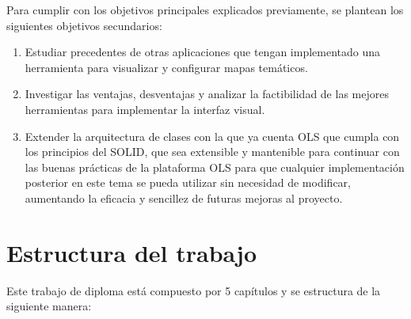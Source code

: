 Para cumplir con los objetivos principales explicados previamente, se plantean los siguientes objetivos secundarios:

\begin{enumerate}
\item Estudiar precedentes de otras aplicaciones que tengan implementado una herramienta para visualizar y configurar mapas tem\'aticos.
\item Investigar las ventajas, desventajas y analizar la factibilidad de las mejores herramientas para implementar la interfaz visual.
\item Extender la arquitectura de clases con la que ya cuenta OLS que cumpla con los principios del SOLID, que sea extensible y mantenible para continuar con las buenas pr\'acticas de la plataforma OLS para que cualquier implementaci\'on posterior en este tema se pueda utilizar sin necesidad de modificar, aumentando la eficacia y sencillez de futuras mejoras al proyecto. \\
\end{enumerate}


\section{Estructura del trabajo}
Este trabajo de diploma est\'a compuesto por 5 cap\'itulos y se estructura de la siguiente manera:

